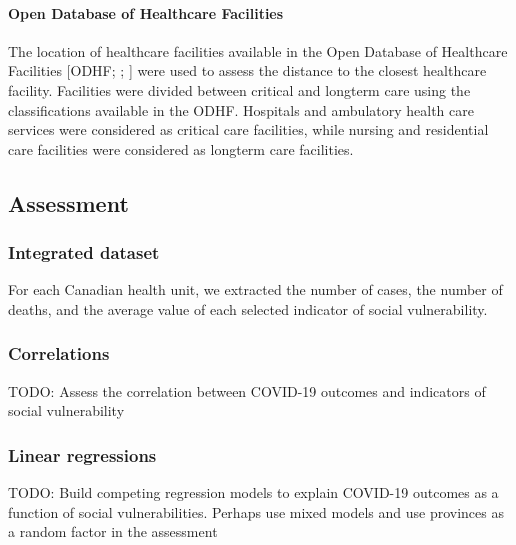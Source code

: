 \documentclass[preprint, 3p,
authoryear]{elsarticle} %
\begin{document}
\hypertarget{open-database-of-healthcare-facilities}{%
\paragraph{Open Database of Healthcare
Facilities}\label{open-database-of-healthcare-facilities}}

The location of healthcare facilities available in the Open Database of
Healthcare Facilities {[}ODHF; \citet{statisticscanada2020};
\citet{statisticscanada2020a}{]} were used to assess the distance to the
closest healthcare facility. Facilities were divided between critical
and longterm care using the classifications available in the ODHF.
Hospitals and ambulatory health care services were considered as
critical care facilities, while nursing and residential care facilities
were considered as longterm care facilities.

\hypertarget{assessment}{%
\subsection{Assessment}\label{assessment}}

\hypertarget{integrated-dataset}{%
\subsubsection{Integrated dataset}\label{integrated-dataset}}

For each Canadian health unit, we extracted the number of cases, the
number of deaths, and the average value of each selected indicator of
social vulnerability.

\hypertarget{correlations}{%
\subsubsection{Correlations}\label{correlations}}

TODO: Assess the correlation between COVID-19 outcomes and indicators of
social vulnerability

\hypertarget{linear-regressions}{%
\subsubsection{Linear regressions}\label{linear-regressions}}

TODO: Build competing regression models to explain COVID-19 outcomes as
a function of social vulnerabilities. Perhaps use mixed models and use
provinces as a random factor in the assessment
\end{document}
